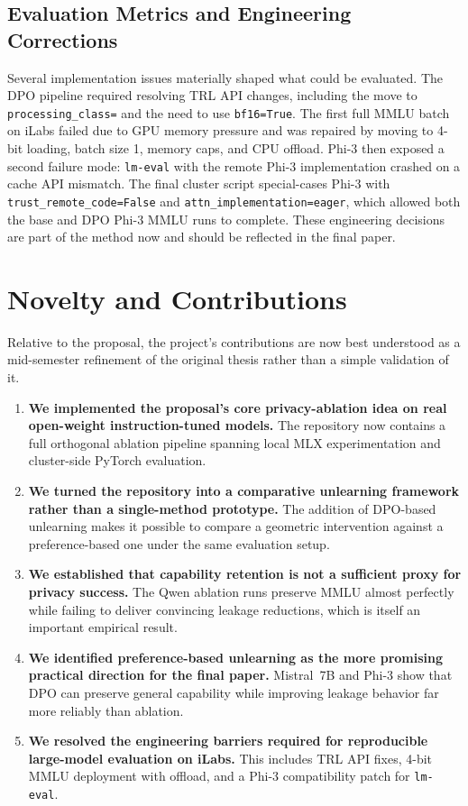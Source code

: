 \documentclass[11pt]{article}
\begin{document}
\subsection{Evaluation Metrics and Engineering Corrections}

Several implementation issues materially shaped what could be evaluated. The DPO pipeline required resolving TRL API changes, including the move to \texttt{processing\_class=} and the need to use \texttt{bf16=True}. The first full MMLU batch on iLabs failed due to GPU memory pressure and was repaired by moving to 4-bit loading, batch size 1, memory caps, and CPU offload. Phi-3 then exposed a second failure mode: \texttt{lm-eval} with the remote Phi-3 implementation crashed on a cache API mismatch. The final cluster script special-cases Phi-3 with \texttt{trust\_remote\_code=False} and \texttt{attn\_implementation=eager}, which allowed both the base and DPO Phi-3 MMLU runs to complete. These engineering decisions are part of the method now and should be reflected in the final paper.

\section{Novelty and Contributions}

Relative to the proposal, the project's contributions are now best understood as a mid-semester refinement of the original thesis rather than a simple validation of it.

\begin{enumerate}
    \item \textbf{We implemented the proposal's core privacy-ablation idea on real open-weight instruction-tuned models.} The repository now contains a full orthogonal ablation pipeline spanning local MLX experimentation and cluster-side PyTorch evaluation.
    \item \textbf{We turned the repository into a comparative unlearning framework rather than a single-method prototype.} The addition of DPO-based unlearning makes it possible to compare a geometric intervention against a preference-based one under the same evaluation setup.
    \item \textbf{We established that capability retention is not a sufficient proxy for privacy success.} The Qwen ablation runs preserve MMLU almost perfectly while failing to deliver convincing leakage reductions, which is itself an important empirical result.
    \item \textbf{We identified preference-based unlearning as the more promising practical direction for the final paper.} Mistral~7B and Phi-3 show that DPO can preserve general capability while improving leakage behavior far more reliably than ablation.
    \item \textbf{We resolved the engineering barriers required for reproducible large-model evaluation on iLabs.} This includes TRL API fixes, 4-bit MMLU deployment with offload, and a Phi-3 compatibility patch for \texttt{lm-eval}.
\end{enumerate}
\end{document}
